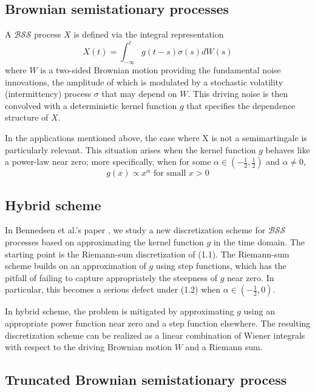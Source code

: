 \documentclass[12pt]{article}
\numberwithin{equation}{section}
\begin{document}
    \subsection{Brownian semistationary processes}

        A $\mathcal{BSS}$ process $X$ is defined via the integral representation
        \begin{equation}
      X(t) = \int_{-\infty}^{t} g(t-s)\sigma(s)dW(s)
    \end{equation}
      where $W$ is a two-sided Brownian motion providing the fundamental noise innovations, the amplitude of which is modulated by a stochastic volatility (intermittency) process $\sigma$ that may depend on $W$. This driving noise is then convolved with a deterministic kernel function $g$ that specifies the dependence structure of $X$.
        
      In the applications mentioned above, the case where X is not a semimartingale is particularly relevant. This situation arises when the kernel function $g$ behaves like a power-law near zero; more specifically, when for some $\alpha \in (-\frac{1}{2}, \frac{1}{2})$ and $\alpha \neq 0$,
        \begin{equation}
      g(x) \propto x^\alpha \text{ for small } x>0
    \end{equation}

  \subsection{Hybrid scheme}
    
    In Bennedsen et al.'s paper \cite{bennedsen2015hybrid}, we study a new discretization scheme for $\mathcal{BSS}$ processes based on approximating the kernel function $g$ in the time domain. The starting point is the Riemann-sum discretization of (1.1). The Riemann-sum scheme builds on an approximation of $g$ using step functions, which has the pitfall of failing to capture appropriately the steepness of $g$ near zero. In particular, this becomes a serious defect under (1.2) when $\alpha \in (-\frac{1}{2}, 0)$. 
    
    In hybrid scheme, the problem is mitigated by approximating $g$ using an appropriate power function near zero and a step function elsewhere. The resulting discretization scheme can be realized as a linear combination of Wiener integrals with respect to the driving Brownian motion $W$ and a Riemann sum.
        
  \subsection{Truncated Brownian semistationary process}
    
\end{document}
